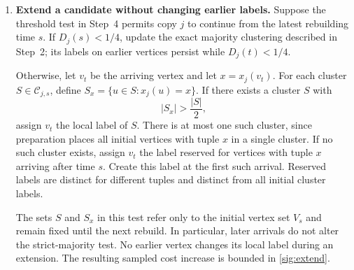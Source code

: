 \documentclass[11pt]{article}
\begin{document}
\begin{enumerate}
At a rebuild with $D_j(s)\ge1/4$, apply the offline construction in
the proof of \cref{off:linear} to copy $j$'s sample restricted to
$V_s$, with accuracy $\delta$ and failure probability
$1/(4000J_0)$. Each call uses independent internal randomness and,
on success, returns a $(\gamma+\delta)$-approximation for the sampled
objective. Apply the preparation procedure of \cref{sig:prepare}
to obtain an \emph{initial clustering} $\mathcal C_{j,s}$ of no
greater sampled cost. This procedure places all vertices with the
same label tuple in a single cluster and establishes the
average-distance bound of that lemma. Assign distinct local labels
to its clusters and set $C_s^j=\mathcal C_{j,s}$.

If $D_j(s)<1/4$, instead initialize the copy with the clustering
consistent with all sampled majority decisions. This clustering
exists and is optimal while $D_j(t)<1/4$, by
\cref{sec:preliminaries}. Label each of its clusters by the smallest
arrival index of one of its vertices.

\item \textbf{Extend a candidate without changing earlier labels.}
Suppose the threshold test in Step~4 permits copy $j$ to continue
from the latest rebuilding time $s$. If $D_j(s)<1/4$, update the
exact majority clustering described in Step~2; its labels on earlier
vertices persist while $D_j(t)<1/4$.

Otherwise, let $v_t$ be the arriving vertex and let $x=x_j(v_t)$.
For each cluster $S\in\mathcal C_{j,s}$, define
$S_x=\{u\in S:x_j(u)=x\}$. If there exists a cluster $S$ with
\[
 |S_x|>\frac{|S|}{2},
\]
assign $v_t$ the local label of $S$. There is at most one such
cluster, since preparation places all initial vertices with tuple
$x$ in a single cluster. If no such cluster exists, assign $v_t$ the
label reserved for vertices with tuple $x$ arriving after time $s$.
Create this label at the first such arrival. Reserved labels are
distinct for different tuples and distinct from all initial cluster
labels.

The sets $S$ and $S_x$ in this test refer only to the initial vertex
set $V_s$ and remain fixed until the next rebuild. In particular,
later arrivals do not alter the strict-majority test. No earlier
vertex changes its local label during an extension. The resulting
sampled cost increase is bounded in \cref{sig:extend}.


\end{enumerate}
\end{document}
